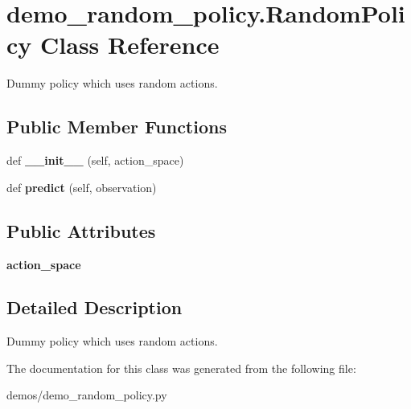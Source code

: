 \hypertarget{classdemo__random__policy_1_1RandomPolicy}{}\section{demo\+\_\+random\+\_\+policy.\+Random\+Policy Class Reference}
\label{classdemo__random__policy_1_1RandomPolicy}


Dummy policy which uses random actions.  


\subsection*{Public Member Functions}
\begin{DoxyCompactItemize}
\item 
\mbox{\label{classdemo__random__policy_1_1RandomPolicy_acf3ead594e7856f4a21854613280e6e0}} 
def {\bfseries \+\_\+\+\_\+init\+\_\+\+\_\+} (self, action\+\_\+space)
\item 
\mbox{\label{classdemo__random__policy_1_1RandomPolicy_a2d594da9acda1a454d4986f5a0017dbe}} 
def {\bfseries predict} (self, observation)
\end{DoxyCompactItemize}
\subsection*{Public Attributes}
\begin{DoxyCompactItemize}
\item 
\mbox{\label{classdemo__random__policy_1_1RandomPolicy_a97882a0e59c4258e6001128b9f194c21}} 
{\bfseries action\+\_\+space}
\end{DoxyCompactItemize}


\subsection{Detailed Description}
Dummy policy which uses random actions. 



The documentation for this class was generated from the following file\+:\begin{DoxyCompactItemize}
\item 
demos/demo\+\_\+random\+\_\+policy.\+py\end{DoxyCompactItemize}
